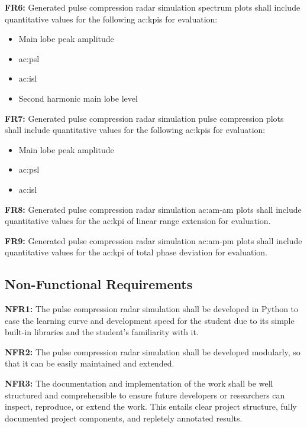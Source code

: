 \textbf{FR6:} Generated pulse compression radar simulation spectrum plots shall include quantitative values for the following \glspl{ac:kpi} for evaluation:
\begin{itemize}
    \item Main lobe peak amplitude
    \item \Gls{ac:psl}
    \item \Gls{ac:isl}
    \item Second harmonic main lobe level
\end{itemize}

\textbf{FR7:} Generated pulse compression radar simulation pulse compression plots shall include quantitative values for the following \glspl{ac:kpi} for evaluation:
\begin{itemize}
    \item Main lobe peak amplitude
    \item \Gls{ac:psl}
    \item \Gls{ac:isl}
\end{itemize}

\textbf{FR8:} Generated pulse compression radar simulation \gls{ac:am-am} plots shall include quantitative values for the \gls{ac:kpi} of linear range extension for evaluation.

\textbf{FR9:} Generated pulse compression radar simulation \gls{ac:am-pm} plots shall include quantitative values for the \gls{ac:kpi} of total phase deviation for evaluation.

\subsection{Non-Functional Requirements}

\textbf{NFR1:} The pulse compression radar simulation shall be developed in Python to ease the learning curve and development speed for the student due to its simple built-in libraries and the student's familiarity with it.

\textbf{NFR2:} The pulse compression radar simulation shall be developed modularly, so that it can be easily maintained and extended.

\textbf{NFR3:} The documentation and implementation of the work shall be well structured and comprehensible to ensure future developers or researchers can inspect, reproduce, or extend the work. This entails clear project structure, fully documented project components, and repletely annotated results.  